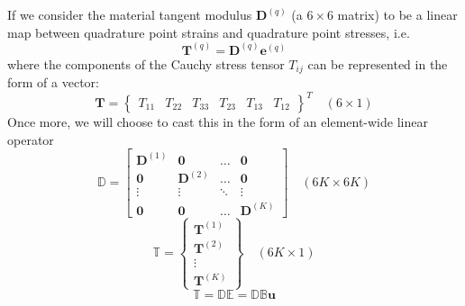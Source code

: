 \documentclass[11pt]{article} %
\begin{document}
If we consider the material tangent modulus $\mathbf{D}^{(q)}$ (a $6 \times 6$ matrix) to be a linear map between quadrature point strains and quadrature point stresses, i.e.
\begin{equation}
	\mathbf{T}^{(q)} = \mathbf{D}^{(q)} \mathbf{e}^{(q)}
\end{equation}
where the components of the Cauchy stress tensor $T_{ij}$ can be represented in the form of a vector:
\begin{equation}
	\mathbf{T} = \left\{ \begin{array}{cccccc} T_{11} & T_{22} & T_{33} & T_{23} & T_{13} & T_{12} \end{array} \right\}^T  \quad (6 \times 1)
\end{equation}
Once more, we will choose to cast this in the form of an element-wide linear operator
\begin{equation}
	\mathbb{D} = \left[ \begin{array}{cccc} \mathbf{D}^{(1)} & \mathbf{0} & \ldots & \mathbf{0} \\ \mathbf{0} & \mathbf{D}^{(2)} & \ldots & \mathbf{0} \\ \vdots & \vdots & \ddots & \vdots \\ \mathbf{0} & \mathbf{0} & \ldots & \mathbf{D}^{(K)} \end{array} \right] \quad (6K \times 6K)
\end{equation}
\begin{equation}
	\mathbb{T} = \left\{ \begin{array}{c} \mathbf{T}^{(1)} \\ \mathbf{T}^{(2)} \\ \vdots \\ \mathbf{T}^{(K)} \end{array} \right\} \quad (6K \times 1)
\end{equation}
\begin{equation}
	\mathbb{T} = \mathbb{D} \mathbb{E} = \mathbb{D} \mathbb{B} \mathbf{u}
\end{equation}
\end{document}
